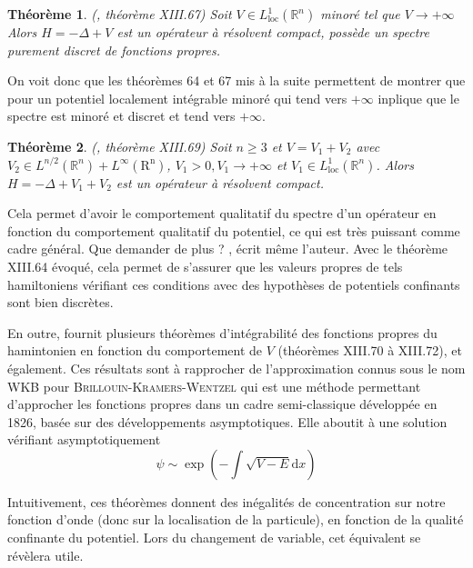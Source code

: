 \documentclass[svgnames,dvipsnames,a4paper,10pt,french]{report}
\newtheorem{theorem}{Théorème}[section]
\begin{document}
\begin{theorem}{(\cite{reed_methods_1980},  théorème XIII.67)}
    Soit $V \in L_\text{loc}^1(\mathbb{R}^n)$ minoré tel que $V\rightarrow +\infty$ Alors $H=-\Delta +V$ est un opérateur à résolvent compact, possède un spectre purement discret de fonctions propres.
\end{theorem}

On voit donc que les théorèmes 64 et 67 mis à la suite permettent de montrer que pour un potentiel localement intégrable  minoré qui tend vers $+\infty$ inplique que le spectre est minoré et discret et tend vers $+\infty$.


\begin{theorem}{(\cite{reed_methods_1980},  théorème XIII.69)}
    Soit $n\ge 3$ et $V = V_1+V_2$ avec $V_2\in L^{n/2}(\mathbb{R}^n)+L^{\infty}(\mathrm{R^n})$, $V_1>0, V_1\rightarrow +\infty$ et $V_1\in L_\text{loc}^1(\mathbb{R}^n)$. Alors $H=-\Delta +V_1+V_2$ est un opérateur à résolvent compact.
\end{theorem}

Cela permet d'avoir le  comportement qualitatif du spectre d'un opérateur en fonction du comportement qualitatif du potentiel, ce qui est très puissant comme cadre général. \og Que demander de plus ? \fg{}, écrit même l'auteur. Avec le théorème XIII.64 évoqué, cela permet de s'assurer que les valeurs propres de tels hamiltoniens vérifiant ces conditions avec des hypothèses de potentiels confinants sont bien discrètes.


En outre, \cite{reed_methods_1980} fournit plusieurs théorèmes d'intégrabilité des fonctions propres du hamintonien en fonction du comportement de $V$ (théorèmes XIII.70 à XIII.72), et \cite{simon_pointwise_1975} également. Ces résultats sont à rapprocher de l'approximation connus sous le nom WKB pour \textsc{Brillouin-Kramers-Wentzel} qui est une méthode permettant d'approcher les fonctions propres dans un cadre semi-classique développée en 1826, basée sur des développements asymptotiques. Elle aboutit à une solution vérifiant asymptotiquement
\begin{equation}
\label{bkw_approx}
    \psi \sim \exp \left( -\int \sqrt{V-E} \mathrm{d}x\right)
\end{equation}

Intuitivement, ces théorèmes donnent des inégalités de concentration sur notre fonction d'onde (donc sur la localisation de la particule), en fonction de la qualité \og confinante \fg{} du potentiel. Lors du changement de variable, cet équivalent se révèlera utile.
\end{document}
